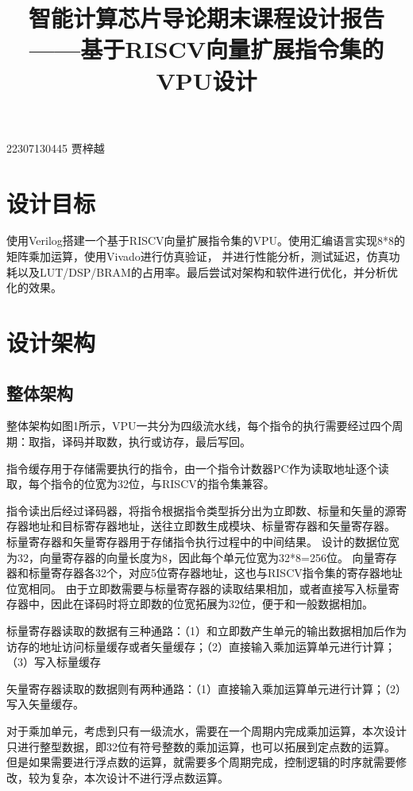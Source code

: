 \documentclass[UTF8]{ctexart}
\begin{document}
\title{智能计算芯片导论期末课程设计报告 \\——基于RISCV向量扩展指令集的VPU设计}
\maketitle
\begin{center}
	22307130445 贾梓越
\end{center}

\section{设计目标}
使用Verilog搭建一个基于RISCV向量扩展指令集的VPU。使用汇编语言实现8*8的矩阵乘加运算，使用Vivado进行仿真验证，
并进行性能分析，测试延迟，仿真功耗以及LUT/DSP/BRAM的占用率。最后尝试对架构和软件进行优化，并分析优化的效果。
\section{设计架构}
\subsection{整体架构}
整体架构如图1所示，VPU一共分为四级流水线，每个指令的执行需要经过四个周期：取指，译码并取数，执行或访存，最后写回。

指令缓存用于存储需要执行的指令，由一个指令计数器PC作为读取地址逐个读取，每个指令的位宽为32位，与RISCV的指令集兼容。

指令读出后经过译码器，将指令根据指令类型拆分出为立即数、标量和矢量的源寄存器地址和目标寄存器地址，送往立即数生成模块、标量寄存器和矢量寄存器。
标量寄存器和矢量寄存器用于存储指令执行过程中的中间结果。
设计的数据位宽为32，向量寄存器的向量长度为8，因此每个单元位宽为32*8=256位。
向量寄存器和标量寄存器各32个，对应5位寄存器地址，这也与RISCV指令集的寄存器地址位宽相同。
由于立即数需要与标量寄存器的读取结果相加，或者直接写入标量寄存器中，因此在译码时将立即数的位宽拓展为32位，便于和一般数据相加。

标量寄存器读取的数据有三种通路：（1）和立即数产生单元的输出数据相加后作为访存的地址访问标量缓存或者矢量缓存；（2）直接输入乘加运算单元进行计算；（3）写入标量缓存

矢量寄存器读取的数据则有两种通路：（1）直接输入乘加运算单元进行计算；（2）写入矢量缓存。

对于乘加单元，考虑到只有一级流水，需要在一个周期内完成乘加运算，本次设计只进行整型数据，即32位有符号整数的乘加运算，也可以拓展到定点数的运算。
但是如果需要进行浮点数的运算，就需要多个周期完成，控制逻辑的时序就需要修改，较为复杂，本次设计不进行浮点数运算。
\end{document}
